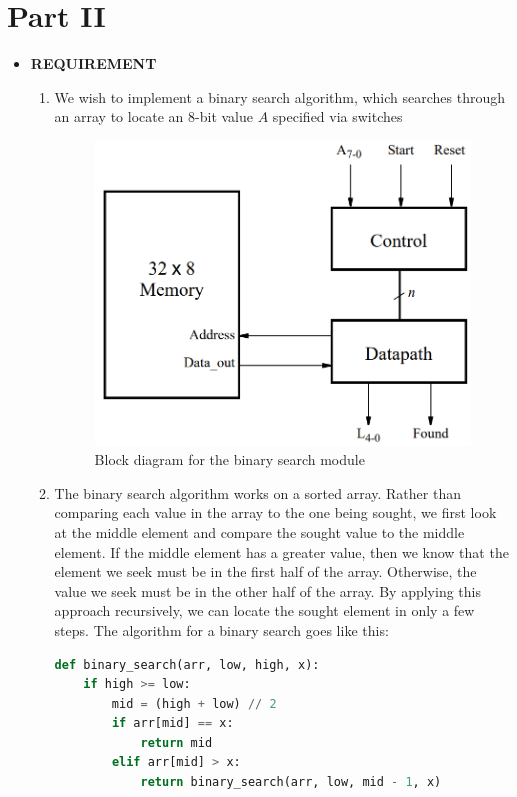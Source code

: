 \section{Part II}
\begin{itemize}
    \item []\textbf{REQUIREMENT} 
        \begin{enumerate}

            \item We wish to implement a binary search algorithm, which searches through an array to locate an 8-bit value $A$ specified via switches
                \begin{figure}[h]
                    \centering
                    \includegraphics[width=4in]{source/picture/Lab11/Screenshot 2021-12-24 161403.png}
                    \caption{Block diagram for the binary search module}
                \end{figure}
            \item The binary search algorithm works on a sorted array. Rather than comparing each value in the array to the one being sought, we first look at the middle element and compare the sought value to the middle element. If the middle element has a greater value, then we know that the element we seek must be in the first half of the array. Otherwise, the value we seek must be in the other half of the array. By applying this approach recursively, we can locate the sought element in only a few steps. The algorithm for a binary search goes like this:
                \begin{lstlisting}[language=Python]
def binary_search(arr, low, high, x):
    if high >= low:
        mid = (high + low) // 2
        if arr[mid] == x:
            return mid
        elif arr[mid] > x:
            return binary_search(arr, low, mid - 1, x)

\end{lstlisting}
\end{enumerate}
\end{itemize}
